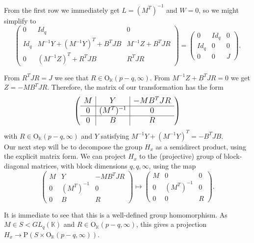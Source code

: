\documentclass{article}
\theoremstyle{definition}
\theoremstyle{remark}
\theoremstyle{plain}
\begin{document}
From the first row we immediately get $L=(M^T)^{-1}$ and $W=0$, so we might simplify to $$\left(\begin{array}{c|c|c}
    0 & Id_q & 0 \\
    \hline
    Id_q & M^{-1} Y + (M^{-1} Y)^T + B^T J B & M^{-1} Z + B^T J R \\
    \hline
    0 & (M^{-1} Z)^T + R^T J B & R^T J R
\end{array}\right)=\left(\begin{array}{c|c|c}
    0 & Id_q & 0 \\
    \hline
    Id_q & 0 & 0 \\
    \hline
    0 & 0 & J
\end{array}\right).$$

From $R^T J R = J$ we see that $R\in \mathrm{O}_\mathbb{K}(p-q,\infty)$. From $M^{-1} Z + B^T J R = 0$ we get $Z = - M B^T J R$. Therefore, the matrix of our transformation has the form $$\large \left(\begin{array}{c|c|c}
    M & Y & -M B^T J R \\
    \hline
    0 & (M^T)^{-1} & 0 \\
    \hline
    0 & B & R
\end{array}\right)$$ with $R\in\mathrm{O}_\mathbb{K}(p-q,\infty)$ and $Y$ satisfying $M^{-1} Y + (M^{-1} Y)^T = - B^T J B$. \\

Our next step will be to decompose the group $H_x$ as a semidirect product, using the explicit matrix form. We can project $H_x$ to the (projective) group of block-diagonal matrices, with block dimensions $q,q,\infty$, using the map $$\left(\begin{array}{c|c|c}
    M & Y & -M B^T J R \\
    \hline
    0 & (M^T)^{-1} & 0 \\
    \hline
    0 & B & R
\end{array}\right)\mapsto\left(\begin{array}{c|c|c}
    M & 0 & 0 \\
    \hline
    0 & (M^T)^{-1} & 0 \\
    \hline
    0 & 0 & R
\end{array}\right).$$

It is immediate to see that this is a well-defined group homomorphism. As $M\in S<GL_q(\mathbb{K})$ and $R\in \mathrm{O}_\mathbb{K}(p-q,\infty)$, this gives a projection $H_x\rightarrow \mathrm{P}(S\times\mathrm{O}_\mathbb{K}(p-q,\infty))$. \\
\end{document}
